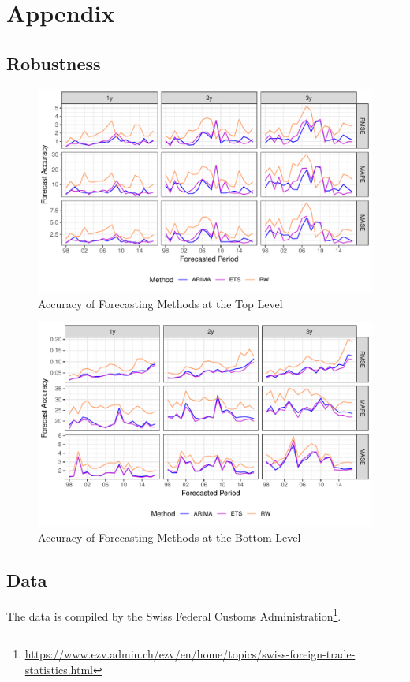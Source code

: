
\appendix
\section{Appendix}


\subsection{Robustness}
\label{sec:robust}

\begin{figure}[H]
	\includegraphics[width=\textwidth]{fig/fig_eval_methods_top}
	\caption{Accuracy of Forecasting Methods at the Top Level}
\end{figure}

\begin{figure}[H]
	\includegraphics[width=\textwidth]{fig/fig_eval_methods_bottom}
	\caption{Accuracy of Forecasting Methods at the Bottom Level}
\end{figure}


\subsection{Data}
\label{sec:data}
The data is compiled by the Swiss Federal Customs Administration\footnote{\url{https://www.ezv.admin.ch/ezv/en/home/topics/swiss-foreign-trade-statistics.html}}.\\

